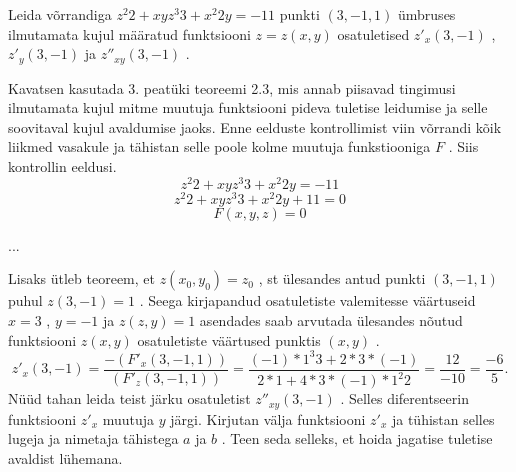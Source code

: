 \documentclass{article}
\begin{document}
Leida võrrandiga $z^{2}2+xyz^{3}3+x^{2}2 y = -11$ punkti $(3,-1,1)$ ümbruses ilmutamata kujul määratud funktsiooni $z=z(x,y)$ osatuletised $z'_{x} (3,-1)$ ,  $z'_{y} (3,-1)$ ja $z''_{xy} (3,-1)$ .

Kavatsen kasutada 3. peatüki teoreemi 2.3, mis annab piisavad tingimusi ilmutamata kujul mitme muutuja funktsiooni pideva tuletise leidumise ja selle soovitaval kujul avaldumise jaoks. Enne eelduste kontrollimist viin võrrandi kõik liikmed vasakule ja tähistan selle poole kolme muutuja funkstiooniga $F$ . Siis kontrollin eeldusi.
\[ z^{2}2+xyz^{3}3 + x^{2}2 y = -11\] 
\[ z^{2}2+xyz^{3}3+x^{2}2 y+11=0\] 
\[ F(x,y,z) = 0\] 

...

Lisaks ütleb teoreem, et $z(x_0, y_0) = z_0$ , st ülesandes antud punkti $(3,-1,1)$ puhul $z(3,-1) = 1$ . Seega kirjapandud osatuletiste valemitesse väärtuseid $x=3$ , $y=-1$ ja $z(z,y)=1$ asendades saab arvutada ülesandes nõutud funktsiooni $z(x,y)$ osatuletiste väärtused punktis $(x,y)$ .
\[ z'_{x} (3,-1) = \frac{-(F'_{x} (3,-1,1))}{(F'_{z} (3,-1,1))} = \frac{(-1)*1^{3}3+2*3*(-1)}{2*1+4*3*(-1)*1^{2}2} = \frac{12}{-10} = \frac{-6}{5} .\] 
Nüüd tahan leida teist järku osatuletist $z''_{xy} (3,-1)$ . Selles diferentseerin funktsiooni $z'_{x}$ muutuja $y$ järgi. Kirjutan välja funktsiooni $z'_{x}$ ja tühistan selles lugeja ja nimetaja tähistega $a$ ja $b$ . Teen seda selleks, et hoida jagatise tuletise avaldist lühemana.
\end{document}
